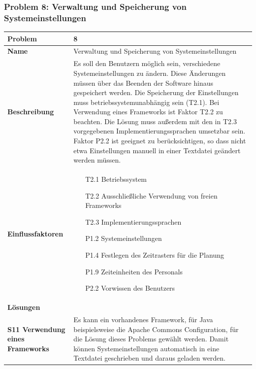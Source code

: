 \documentclass[fontsize=12pt,paper=a4,twoside]{scrartcl}
\begin{document}
\subsubsection{Problem 8: Verwaltung und Speicherung von Systemeinstellungen}
\begin{tabularx}{\textwidth}{|p{6cm}|X|}
 \hline
 \textbf{Problem} & 8\\\hline
 \textbf{Name} & Verwaltung und Speicherung von Systemeinstellungen\\\hline 
 \textbf{Beschreibung} & 
Es soll den Benutzern möglich sein, verschiedene Systemeinstellungen zu ändern. Diese Änderungen müssen über das Beenden der Software hinaus gespeichert werden. Die Speicherung der Einstellungen muss betriebssystemunabhängig sein (T2.1). Bei Verwendung eines Frameworks ist Faktor T2.2 zu beachten. Die Lösung muss außerdem mit den in T2.3 vorgegebenen Implementierungssprachen umsetzbar sein. Faktor P2.2 ist geeignet zu berücksichtigen, so dass nicht etwa Einstellungen manuell in einer Textdatei geändert werden müssen. \\\hline
 \textbf{Einflussfaktoren} &
 \begin{itemize}
\item[T2.1] Betriebssystem
\item[T2.2] Ausschließliche Verwendung von freien Frameworks
\item[T2.3] Implementierungssprachen
\item[P1.2] Systemeinstellungen
\item[P1.4] Festlegen des Zeitrasters für die Planung
\item[P1.9] Zeiteinheiten des Personals
\item[P2.2] Vorwissen des Benutzers
 \end{itemize}\\\hline
\multicolumn{2}{|l|}{\textbf{Lösungen}} \\\hline
\textbf{S11 Verwendung eines Frameworks} & Es kann ein vorhandenes Framework, für Java beispielsweise die Apache Commons Configuration, für die Lösung dieses Problems gewählt werden. Damit können Systemeinstellungen automatisch in eine Textdatei geschrieben und daraus geladen werden.\\\hline
\end{tabularx}
\newpage
\end{document}
